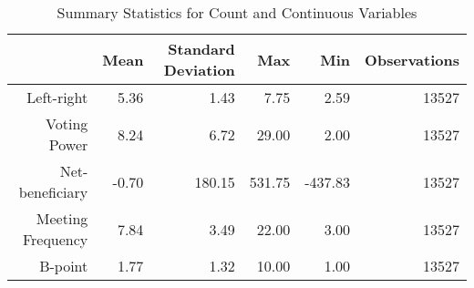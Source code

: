 \begin{table*}[ht]
\begin{center}
\begin{tabular}{rrrrrr}
  \hline
 & Mean & Standard Deviation & Max & Min & Observations\\ 
  \hline
Left-right & 5.36 & 1.43 & 7.75 & 2.59 & 13527\\ 
  Voting Power & 8.24 & 6.72 & 29.00 & 2.00 &13527 \\ 
  Net-beneficiary & -0.70 & 180.15 & 531.75 & -437.83 & 13527 \\ 
  Meeting Frequency & 7.84 & 3.49 & 22.00 & 3.00 & 13527\\ 
  B-point & 1.77 & 1.32 & 10.00 & 1.00 & 13527\\ 
   \hline
\end{tabular}
\end{center}
\caption{Summary Statistics for Count and Continuous Variables}
\label{tab:summary}
\end{table*}



